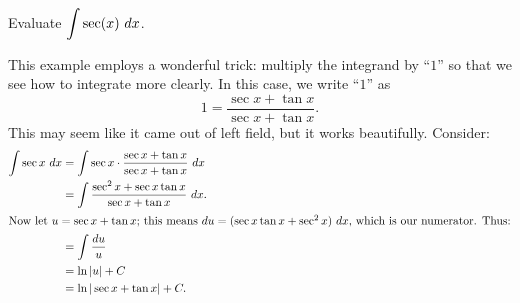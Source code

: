\begin{example} \label{eg:4.6.usub6} %
Evaluate $\displaystyle\int \sec(x) \ dx$.

\solution
This example employs a wonderful trick: multiply the integrand by ``$1$'' so that we see how to integrate more clearly. In this case, we write ``$1$'' as
\[ 1 = \frac{\sec x + \tan x}{\sec x + \tan x}. \]
This may seem like it came out of left field, but it works beautifully. Consider:
\begin{align*}
\int \sec x\ dx	&=	\int \sec x\cdot \frac{\sec x + \tan x}{\sec x + \tan x}\ dx \\
&= \int \frac{\sec^2 x + \sec x\tan x}{\sec x + \tan x}\ dx.\\
\intertext{Now let $u = \sec x+\tan x$; this means $du = (\sec x\tan x+ \sec^2 x)\ dx$, which is our numerator. Thus:}
&= \int \frac{du}{u} \\
&= \ln |u| + C \\
&= \ln |\sec x+\tan x| + C.
\end{align*}
\end{example}